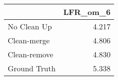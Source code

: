\begin{tabular}{lr}
\toprule
{} & LFR_om_6 \\
\midrule
No Clean Up  &    4.217 \\
Clean-merge  &    4.806 \\
Clean-remove &    4.830 \\
Ground Truth &    5.338 \\
\bottomrule
\end{tabular}

